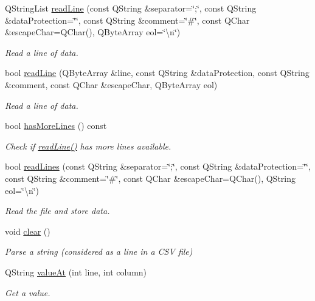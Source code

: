 \begin{DoxyCompactItemize}
Q\-String\-List \hyperlink{classmdt_csv_file_a0c16f0024802eb675872aef129317eb8}{read\-Line} (const Q\-String \&separator=\char`\"{};\char`\"{}, const Q\-String \&data\-Protection=\char`\"{}\char`\"{}, const Q\-String \&comment=\char`\"{}\#\char`\"{}, const Q\-Char \&escape\-Char=Q\-Char(), Q\-Byte\-Array eol=\char`\"{}\textbackslash{}n\char`\"{})
\begin{DoxyCompactList}\small\item\em Read a line of data. \end{DoxyCompactList}\item 
bool \hyperlink{classmdt_csv_file_a56c5d054c044cba2e4d617f5185a13ed}{read\-Line} (Q\-Byte\-Array \&line, const Q\-String \&data\-Protection, const Q\-String \&comment, const Q\-Char \&escape\-Char, Q\-Byte\-Array eol)
\begin{DoxyCompactList}\small\item\em Read a line of data. \end{DoxyCompactList}\item 
bool \hyperlink{classmdt_csv_file_a1e8fa47acbbbf4e5fc7715e80e20d59b}{has\-More\-Lines} () const 
\begin{DoxyCompactList}\small\item\em Check if \hyperlink{classmdt_csv_file_aa7d5e7ab9d6d71f7ca1c9fe7bea043a3}{read\-Line()} has more lines available. \end{DoxyCompactList}\item 
bool \hyperlink{classmdt_csv_file_adeb771789de28feb5c1ec326b179e83b}{read\-Lines} (const Q\-String \&separator=\char`\"{};\char`\"{}, const Q\-String \&data\-Protection=\char`\"{}\char`\"{}, const Q\-String \&comment=\char`\"{}\#\char`\"{}, const Q\-Char \&escape\-Char=Q\-Char(), Q\-String eol=\char`\"{}\textbackslash{}n\char`\"{})
\begin{DoxyCompactList}\small\item\em Read the file and store data. \end{DoxyCompactList}\item 
void \hyperlink{classmdt_csv_file_afe815d4fbdc08c442c9b1dce447cda75}{clear} ()
\begin{DoxyCompactList}\small\item\em Parse a string (considered as a line in a C\-S\-V file) \end{DoxyCompactList}\item 
Q\-String \hyperlink{classmdt_csv_file_af2d0917f92dd0d0d8100edccf1d3e4ee}{value\-At} (int line, int column)
\begin{DoxyCompactList}\small\item\em Get a value. \end{DoxyCompactList}\item 

\end{DoxyCompactItemize}
